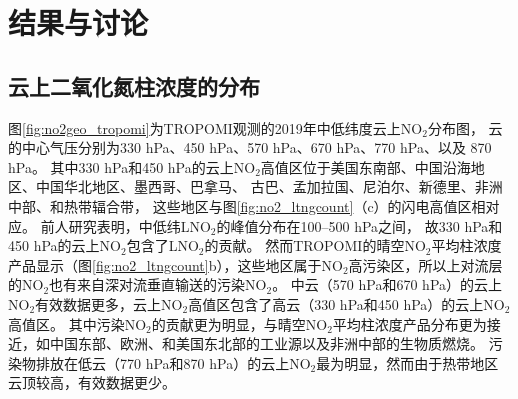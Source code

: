 


\section{结果与讨论}

\subsection{云上二氧化氮柱浓度的分布} \label{sec:no2_vcd_cld}

图\ref{fig:no2geo_tropomi}为TROPOMI观测的2019年中低纬度云上NO$_2$分布图，
云的中心气压分别为330 hPa、450 hPa、570 hPa、670 hPa、770 hPa、以及 870 hPa。
其中330 hPa和450 hPa的云上NO$_2$高值区位于美国东南部、中国沿海地区、中国华北地区、墨西哥、巴拿马、
古巴、孟加拉国、尼泊尔、新德里、非洲中部、和热带辐合带，
这些地区与图\ref{fig:no2_ltngcount}（c）的闪电高值区相对应。
前人研究表明，中低纬LNO$_2$的峰值分布在100--500 hPa之间\citep{Pickering.1988,Ott.2010,Luo.2017}，
故330 hPa和450 hPa的云上NO$_2$包含了LNO$_2$的贡献。
然而TROPOMI的晴空NO$_2$平均柱浓度产品显示（图\ref{fig:no2_ltngcount}b），这些地区属于NO$_2$高污染区，所以上对流层的NO$_2$也有来自深对流垂直输送的污染NO$_2$。
中云（570 hPa和670 hPa）的云上NO$_2$有效数据更多，云上NO$_2$高值区包含了高云（330 hPa和450 hPa）的云上NO$_2$高值区。
其中污染NO$_2$的贡献更为明显，与晴空NO$_2$平均柱浓度产品分布更为接近，如中国东部、欧洲、和美国东北部的工业源以及非洲中部的生物质燃烧。
污染物排放在低云（770 hPa和870 hPa）的云上NO$_2$最为明显，然而由于热带地区云顶较高，有效数据更少。



